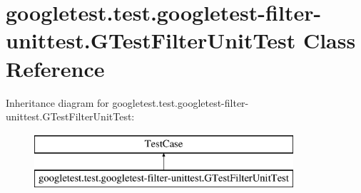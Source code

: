 \hypertarget{classgoogletest_1_1test_1_1googletest-filter-unittest_1_1_g_test_filter_unit_test}{}\section{googletest.\+test.\+googletest-\/filter-\/unittest.G\+Test\+Filter\+Unit\+Test Class Reference}
\label{classgoogletest_1_1test_1_1googletest-filter-unittest_1_1_g_test_filter_unit_test}
Inheritance diagram for googletest.\+test.\+googletest-\/filter-\/unittest.G\+Test\+Filter\+Unit\+Test\+:\begin{figure}[H]
\begin{center}
\leavevmode
\includegraphics[height=2.000000cm]{d8/d75/classgoogletest_1_1test_1_1googletest-filter-unittest_1_1_g_test_filter_unit_test}
\end{center}
\end{figure}

